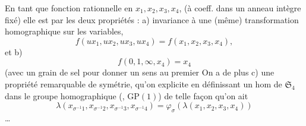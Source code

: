 En tant que fonction rationnelle en $x_1,x_2,x_3,x_4$,
(à coeff. dans un anneau intègre fixé) elle
est  par les deux propriétés : a) invariance  à une (même) transformation
homographique sur les variables,  
\[
f(ux_1,ux_2,ux_3,ux_4)=f(x_1,x_2,x_3,x_4),
\]
et b)
\[
f(0,1,\infty,x_4)=x_4
\]
(avec un grain de sel pour donner un
sens au premier  On a de plus
c) une propriété remarquable de symétrie,
qu'on  explicite en définissant un hom
de $\mathfrak S_4$ dans le groupe homographique
(, $\mathrm{GP}(1)$)
de telle façon qu'on ait
\[
\lambda(x_{\sigma^{-1}1},x_{\sigma^{-1}2},x_{\sigma^{-1}3},x_{\sigma^{-1}4})
=\varphi_\sigma(\lambda(x_1,x_2,x_3,x_4))
\tag{80}
\]
\ldots
